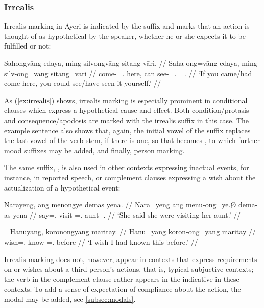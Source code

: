 \subsubsection{Irrealis}

Irrealis marking in Ayeri is indicated by the suffix  and 
marks that an action is thought of as hypothetical by the speaker, whether he 
or she expects it to be fulfilled or not:

\ex\label{ex:irrealis}\begingl
	\gla Sahongvāng edaya, ming silvongvāng sitang-vāri. //
	\glb Saha-ong=vāng edaya, ming silv-ong=vāng sitang=vāri //
	\glb come-\Irr{}=\Ssg{}.\Aarg{} here, can see-\Irr{}=\Ssg{}.\Aarg{} 
		\Refl{}=\Ssg{}.\Ins{} //
	\glft `If you came/had come here, you could see/have seen it  
		yourself.' //
\endgl\xe

As (\ref{ex:irrealis}) shows, irrealis marking is especially prominent in 
conditional clauses which express a hypothetical cause and effect. Both 
condition/protasis and consequence/apodosis are marked with the irrealis suffix 
in this case. The example sentence also shows that, again, the initial vowel of 
the suffix replaces the last vowel of the verb stem, if there is one, so that 
 becomes , to which further mood suffixes 
may be added, and finally, person marking.

The same suffix, , is also used in other contexts expressing 
inactual events, for instance, in reported speech, or complement clauses 
expressing a wish about the actualization of a hypothetical event:

\ex\begingl
	\gla Narayeng, ang menongye demās yena. //
	\glb Nara=yeng ang menu-ong=ye.Ø dema-as yena //
	\glc say=\TsgF{}.\Aarg{} \AgtT{} visit-\Irr{}=\TsgF{}.\Top{} 
		aunt-\Parg{} \TsgF{}.\Gen{} //
	\glft `She said she were visiting her aunt.' //
\endgl\xe

\ex~\begingl
	\gla Hanuyang, koronongyang maritay. //
	\glb Hanu=yang koron-ong=yang maritay //
	\glc wish=\Fsg{}.\Aarg{} know-\Irr{}=\Fsg{}.\Aarg{} before //
	\glft `I wish I had known this before.' //
\endgl\xe

Irrealis marking does not, however, appear in contexts that express 
requirements on or wishes about a third person's actions, that is, typical 
subjuctive contexts; the verb in the complement clause rather appears in the 
indicative in these contexts. To add a sense of expectation of compliance about 
the action, the modal  may be added, see 
\autoref{subsec:modals}.

